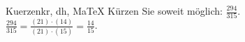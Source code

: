 \begin{MAufgabe}{Kuerzen}{kr, dh, MaTeX}
K\"urzen Sie soweit m\"oglich: $\frac{294}{315}$.\\ 
\ifLsg\MLoesung
\quad $\frac{294}{315}=\frac{(21)\cdot(14)}{(21)\cdot(15)}=\frac{14}{15}$.\else\relax\fi
 \end{MAufgabe}